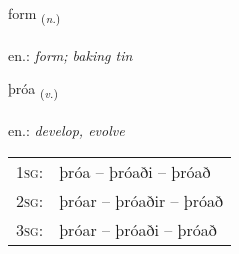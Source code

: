 \documentclass[frontgrid, backgrid]{flacards}\usepackage[]{graphicx}\usepackage[]{xcolor}
\begin{document}
\renewcommand{\blhead}{\vskip5pt {\small\bfseries\footnotesize Nafnorð | Noun }}
\renewcommand{\bcfoot}{\vskip5pt \hspace{2pt}{\small\bfseries\footnotesize 1K}}


{form \small{\textsubscript{(\textit{n.})}} \\[1ex] %
\textphonetic{[fɔrm]} \\
en.: \emph{form; baking tin} \\  [2ex]
\renewcommand*{\arraystretch}{0.8}
}

\renewcommand{\flhead}{\vskip5pt \fboxsep=0pt {\small\bfseries\footnotesize Sagnorð | Verb}}
\renewcommand{\fcfoot}{\vskip5pt \fboxsep=0pt \hspace{2pt}{\small\bfseries\footnotesize 1K}}

\renewcommand{\blhead}{\vskip5pt {\small\bfseries\footnotesize Sagnorð | Verb }}
\renewcommand{\bcfoot}{\vskip5pt \hspace{2pt}{\small\bfseries\footnotesize 1K}}


{þróa \small{\textsubscript{(\textit{v.})}} \\[1ex] %
\textphonetic{[θrouːa]} \\
en.: \emph{develop, evolve} \\  [2ex]
\renewcommand*{\arraystretch}{0.8}
\begin{tabular}{p{1cm}l}
\textsc{1sg}: & þróa -- þróaði -- þróað \\ 
\textsc{2sg}: & þróar -- þróaðir -- þróað \\ 
\textsc{3sg}: & þróar -- þróaði -- þróað \\ 
\end{tabular}
}

\renewcommand{\flhead}{\vskip5pt \fboxsep=0pt {\small\bfseries\footnotesize Lýsingarorð | Adjective}}
\renewcommand{\fcfoot}{\vskip5pt \fboxsep=0pt \hspace{2pt}{\small\bfseries\footnotesize 1K}}
\end{document}
